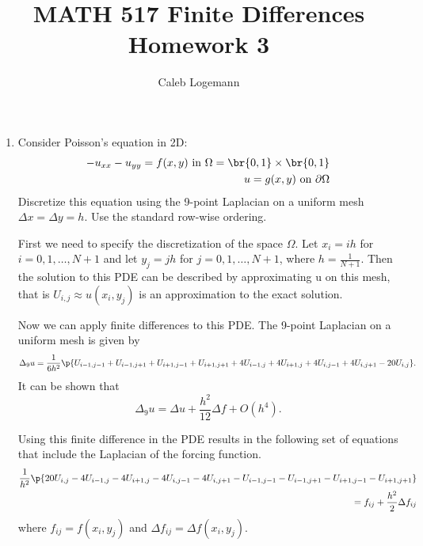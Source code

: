 \documentclass[11pt, oneside, titlepage]{article}
\title{MATH 517 Finite Differences Homework 3}
\author{Caleb Logemann}
\begin{document}
\maketitle

%
\begin{enumerate}
    \item %
        Consider Poisson's equation in 2D:
        \begin{align*}
            -u_{xx} - u_{yy} = f(x,y)\text{ in } \Omega = \br{0, 1} \times \br{0, 1} \\
            u = g(x,y)\text{ on } \partial\Omega
        \end{align*}
        Discretize this equation using the 9-point Laplacian on a uniform mesh
        $\Delta x = \Delta y = h$.
        Use the standard row-wise ordering.

        First we need to specify the discretization of the space $\Omega$.
        Let $x_i = ih$ for $i = 0, 1, \ldots, N+1$ and let $y_j = jh$ for
        $j = 0, 1, \ldots, N+1$, where $h = \frac{1}{N+1}$.
        Then the solution to this PDE can be described by approximating u on
        this mesh, that is $U_{i,j} \approx u(x_i, y_j)$ is an approximation
        to the exact solution.

        Now we can apply finite differences to this PDE.
        The 9-point Laplacian on a uniform mesh is given by 
        \[
            \Delta_9 u = \frac{1}{6h^2}\p{U_{i-1,j-1} + U_{i-1,j+1} +
            U_{i+1,j-1} + U_{i+1,j+1} + 4U_{i-1,j} + 4U_{i+1,j} + 4U_{i,j-1} + 4U_{i,j+1} - 20U_{i,j}}.
        \]
        It can be shown that 
        \[
            \Delta_9 u = \Delta u + \frac{h^2}{12}\Delta f + O(h^4).
        \]

        Using this finite difference in the PDE results in the following set
        of equations that include the Laplacian of the forcing function.
        \begin{align*}
            \frac{1}{h^2}\p{20U_{i,j} - 4U_{i-1,j} - 4U_{i+1,j} - 4U_{i,j-1} -
            4U_{i,j+1} - U_{i-1,j-1} - U_{i-1,j+1} - U_{i+1,j-1} - U_{i+1,j+1}} \\
            = f_{ij} + \frac{h^2}{2} \Delta f_{ij}
        \end{align*}
        where $f_{ij} = f(x_i, y_j)$ and $\Delta f_{ij} = \Delta f(x_i, y_j)$.


\end{enumerate}
\end{document}
